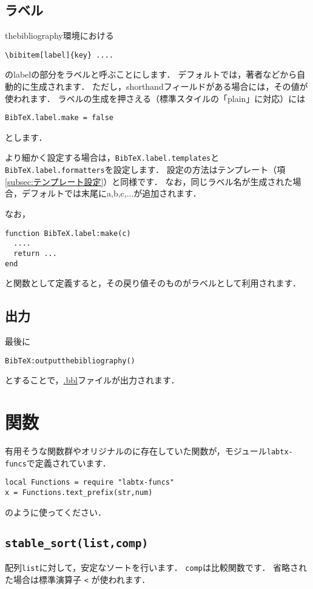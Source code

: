 \documentclass[a4paper]{ltjsarticle}
\newcommand{\luafunc}[1]{\texttt{#1}}
\newcommand*{\luavar}[1]{\texttt{#1}}
\begin{document}
\subsection{ラベル}
thebibliography環境における
\begin{lstlisting}[language={[latex]TeX}]
\bibitem[label]{key} ....
\end{lstlisting}
のlabelの部分をラベルと呼ぶことにします．
デフォルトでは，著者などから自動的に生成されます．
ただし，shorthandフィールドがある場合には，その値が使われます．
ラベルの生成を押さえる（標準スタイルの「plain」に対応）には
\begin{lstlisting}
BibTeX.label.make = false
\end{lstlisting}
とします．

より細かく設定する場合は，\luavar{BibTeX.label.templates}と\luavar{BibTeX.label.formatters}を設定します．
設定の方法はテンプレート（項\ref{subsec:テンプレート設定}）と同様です．
なお，同じラベル名が生成された場合，デフォルトでは末尾にa,b,c,...が追加されます．

なお，
\begin{lstlisting}
function BibTeX.label:make(c)
  ....
  return ...
end
\end{lstlisting}
と関数として定義すると，その戻り値そのものがラベルとして利用されます．

\subsection{出力}
最後に
\begin{lstlisting}
BibTeX:outputthebibliography()
\end{lstlisting}
とすることで，\url{.bbl}ファイルが出力されます．

\section{関数}\label{sec:関数}
有用そうな関数群やオリジナルの\BibTeX に存在していた関数が，モジュール\luavar{labtx-funcs}で定義されています．
\begin{lstlisting}
local Functions = require "labtx-funcs"
x = Functions.text_prefix(str,num)
\end{lstlisting}
のように使ってください．

\subsection{\luafunc{stable\_sort(list,comp)}}
配列\luavar{list}に対して，安定なソートを行います．
\luavar{comp}は比較関数です．
省略された場合は標準演算子 \luafunc{<} が使われます．
\end{document}
